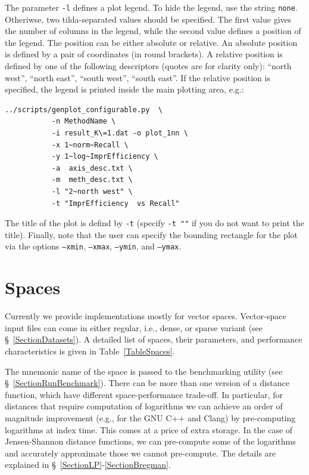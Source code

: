 \documentclass[runningheads,a4paper]{llncs}
\newcommand{\ttt}[1]{\texttt{#1}}
\begin{document}
{The parameter \ttt{-l} defines a plot legend.
To hide the legend, use the string \ttt{none}.
Otheriwse, two tilda-separated values should be specified.
The first value gives the number of columns in the legend, while the second value
defines a position of the legend. The position can be either 
absolute or relative.
An absolute position is defined by a pair of coordinates (in round brackets).
A relative position is defined by one of the following descriptors 
(quotes are for clarity only): ``north west'', ``north east'', ``south west'', ``south east''.
If the relative position is specified, the legend is printed inside the main
plotting area, e.g.:
\newpage
\begin{verbatim}
../scripts/genplot_configurable.py  \
           -n MethodName \
           -i result_K\=1.dat -o plot_1nn \
           -x 1~norm~Recall \
           -y 1~log~ImprEfficiency \
           -a  axis_desc.txt \
           -m  meth_desc.txt \
           -l "2~north west" \
           -t "ImprEfficiency  vs Recall"
\end{verbatim}

The title of the plot is defind by \ttt{-t} (specify \ttt{-t ""} if you do not want
to print the title). Finally, note that the user can specify the bounding rectangle for the plot
via the options \ttt{--xmin}, \ttt{--xmax}, \ttt{--ymin}, and \ttt{--ymax}.

\section{Spaces}\label{SectionSpaces}
Currently we provide implementations mostly for vector spaces.
Vector-space input files can come in either regular, i.e., dense,
or sparse variant (see \S~\ref{SectionDatasets}). 
A detailed list of spaces, their parameters, 
and performance characteristics is given in Table~\ref{TableSpaces}.

The mnemonic name of the space is passed to the benchmarking utility (see \S~\ref{SectionRunBenchmark}).
There can be more than one version of a distance function,
which have different space-performance trade-off.
In particular, for distances that require computation of logarithms 
we can achieve an order of magnitude improvement (e.g., for the GNU C++
and Clang) by pre-computing
logarithms at index time. This comes at a price of extra storage. 
In the case of Jensen-Shannon distance functions, we can pre-compute some 
of the logarithms and accurately approximate those we cannot pre-compute.
The details are explained in \S~\ref{SectionLP}-\ref{SectionBregman}.

}
\end{document}
